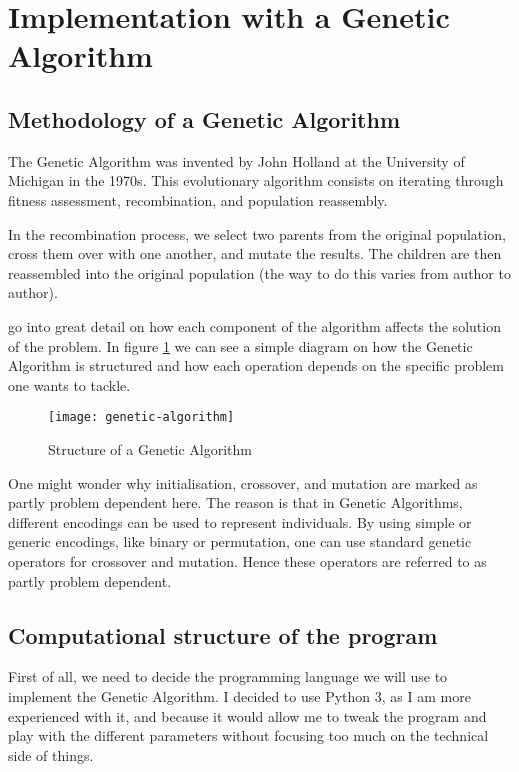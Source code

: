 \section{Implementation with a Genetic Algorithm}\label{sec:implementation}\nocite{Sean2010}
\subsection{Methodology of a Genetic Algorithm}\label{sec:genetic-alg-structure}
The Genetic Algorithm was invented by John Holland at the University of Michigan in the 1970s. This evolutionary algorithm consists on iterating through fitness assessment, recombination, and population reassembly.

In the recombination process, we select two parents from the original population, cross them over with one another, and mutate the results. The children are then reassembled into the original population (the way to do this varies from author to author).

\bigskip
\textcite{Zapfel2010} go into great detail on how each component of the algorithm affects the solution of the problem. In figure \ref{fig:structure} we can see a simple diagram on how the Genetic Algorithm is structured and how each operation depends on the specific problem one wants to tackle.
\begin{figure}[H]
	\centering
	\texttt{[image: genetic-algorithm]}
	\caption{Structure of a Genetic Algorithm}
	\label{fig:structure}
\end{figure}

One might wonder why initialisation, crossover, and mutation are marked as partly problem dependent here. The reason is that in Genetic Algorithms, different encodings can be used to represent individuals. By using simple or generic encodings, like binary or permutation, one can use standard genetic operators for crossover and mutation. Hence these operators are referred to as partly problem dependent. %

\subsection{Computational structure of the program}\label{sec:program}
First of all, we need to decide the programming language we will use to implement the Genetic Algorithm. I decided to use Python 3, as I am more experienced with it, and because it would allow me to tweak the program and play with the different parameters without focusing too much on the technical side of things.

